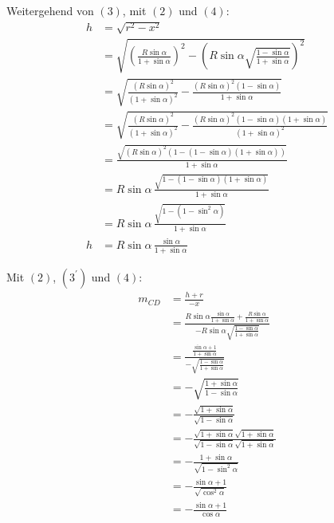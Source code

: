 \documentclass[12pt,a4paper,oneside]{article}
\begin{document}
\begin{samepage}
	Weitergehend von $(3)$, mit $(2)$ und $(4)$: \nopagebreak
	\begin{align*}
		h &= \sqrt{r^2-x^2} \\
		&= \sqrt{\left(\frac{R\sin\alpha}{1+\sin\alpha}\right)^2 - \left(R\sin\alpha\sqrt{\frac{1-\sin\alpha}{1+\sin\alpha}}\right)^2} \\
		&= \sqrt{\frac{(R\sin\alpha)^2}{(1+\sin\alpha)^2} - \frac{(R\sin\alpha)^2(1-\sin\alpha)}{1+\sin\alpha}} \\
		&= \sqrt{\frac{(R\sin\alpha)^2}{(1+\sin\alpha)^2} - \frac{(R\sin\alpha)^2(1-\sin\alpha)(1+\sin\alpha)}{(1+\sin\alpha)^2}} \\
		&= \frac{\sqrt{(R\sin\alpha)^2(1-(1-\sin\alpha)(1+\sin\alpha))}}{1+\sin\alpha} \\
		&= R\sin\alpha \, \frac{\sqrt{1-(1-\sin\alpha)(1+\sin\alpha)}}{1+\sin\alpha} \\
		&= R\sin\alpha \, \frac{\sqrt{1-(1-\sin^2\alpha)}}{1+\sin\alpha} \\
		h &= R\sin\alpha \, \frac{\sin\alpha}{1+\sin\alpha} \tag{$3^\prime$}
	\end{align*}
\end{samepage}
\goodbreak
\begin{samepage}
	Mit $(2)$, $(3^\prime)$ und $(4)$: \nopagebreak
	\begin{align*}
		m_{CD} &= \frac{h+r}{-x} \\
		&= \frac{R\sin\alpha \frac{\sin\alpha}{1+\sin\alpha} + \frac{R\sin\alpha}{1+\sin\alpha}}{-R\sin\alpha\sqrt{\frac{1-\sin\alpha}{1+\sin\alpha}}} \\
		&= \frac{\frac{\sin\alpha+1}{1+\sin\alpha}}{-\sqrt{\frac{1-\sin\alpha}{1+\sin\alpha}}} \\
		&= -\sqrt{\frac{1+\sin\alpha}{1-\sin\alpha}} \\
		&= -\frac{\sqrt{1+\sin\alpha}}{\sqrt{1-\sin\alpha}} \\
		&= -\frac{\sqrt{1+\sin\alpha}\sqrt{1+\sin\alpha}}{\sqrt{1-\sin\alpha}\sqrt{1+\sin\alpha}} \\
		&= -\frac{1+\sin\alpha}{\sqrt{1 - \sin^2\alpha}} \\
		&= -\frac{\sin\alpha+1}{\sqrt{\cos^2\alpha}} \\[15pt]
		&= -\frac{\sin\alpha+1}{\cos\alpha}
	\end{align*}
\end{samepage}
\goodbreak
\end{document}
